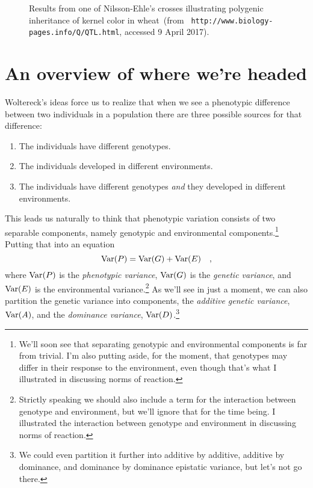 \documentclass[12pt]{article}
\begin{document}
\begin{figure}
\begin{center}
\end{center}
\caption{Results from one of Nilsson-Ehle's crosses illustrating
  polygenic inheritance of kernel color in wheat~(from {\tt
    http://www.biology-pages.info/Q/QTL.html}, accessed 9 April 2017).}\label{fig:nilsson-ehle}
\end{figure}

\section*{An overview of where we're headed}

Woltereck's ideas force us to realize that when we see a phenotypic
difference between two individuals in a population there are three
possible sources for that difference:

\begin{enumerate}

\item The individuals have different genotypes.

\item The individuals developed in different environments.

\item The individuals have different genotypes {\it and\/} they
developed in different environments.

\end{enumerate}

\noindent This leads us naturally to think that phenotypic variation
consists of two separable components, namely genotypic and
environmental components.\footnote{We'll soon see that separating
  genotypic and environmental components is far from trivial. I'm also
  putting aside, for the moment, that genotypes may differ in their
  response to the environment, even though that's what I illustrated
  in discussing norms of reaction.} Putting that into an equation
\[
\mbox{Var}(P) = \mbox{Var}(G) + \mbox{Var}(E) \quad ,
\]
where $\mbox{Var}(P)$ is the {\it phenotypic variance}, $\mbox{Var}(G)$ is the
{\it genetic variance}, and $\mbox{Var}(E)$ is the environmental
variance.\footnote{Strictly speaking we should also include a term for
  the interaction between genotype and environment, but we'll ignore
  that for the time being. I illustrated the interaction between
  genotype and environment in discussing norms of reaction.} As
we'll see in just a moment, we can also partition the genetic variance
into components, the {\it additive genetic variance\/}, $\mbox{Var}(A)$, and
the {\it dominance variance}, $\mbox{Var}(D)$.\footnote{We could even
  partition it further into additive by additive, additive by
  dominance, and dominance by dominance epistatic variance, but let's
  not go there.}
\end{document}
